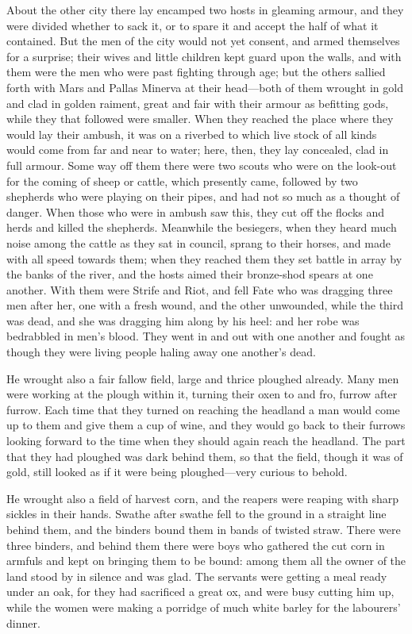About the other city there lay encamped two hosts in gleaming armour, and
they were divided whether to sack it, or to spare it and accept the half
of what it contained. But the men of the city would not yet consent, and
armed themselves for a surprise; their wives and little children kept
guard upon the walls, and with them were the men who were past fighting
through age; but the others sallied forth with Mars and Pallas Minerva at
their head—both of them wrought in gold and clad in golden raiment,
great and fair with their armour as befitting gods, while they that
followed were smaller. When they reached the place where they would lay
their ambush, it was on a riverbed to which live stock of all kinds would
come from far and near to water; here, then, they lay concealed, clad in
full armour. Some way off them there were two scouts who were on the
look-out for the coming of sheep or cattle, which presently came, followed
by two shepherds who were playing on their pipes, and had not so much as a
thought of danger. When those who were in ambush saw this, they cut off
the flocks and herds and killed the shepherds. Meanwhile the besiegers,
when they heard much noise among the cattle as they sat in council, sprang
to their horses, and made with all speed towards them; when they reached
them they set battle in array by the banks of the river, and the hosts
aimed their bronze-shod spears at one another. With them were Strife and
Riot, and fell Fate who was dragging three men after her, one with a fresh
wound, and the other unwounded, while the third was dead, and she was
dragging him along by his heel: and her robe was bedrabbled in men’s
blood. They went in and out with one another and fought as though they
were living people haling away one another’s dead.

He wrought also a fair fallow field, large and thrice ploughed already.
Many men were working at the plough within it, turning their oxen to and
fro, furrow after furrow. Each time that they turned on reaching the
headland a man would come up to them and give them a cup of wine, and they
would go back to their furrows looking forward to the time when they
should again reach the headland. The part that they had ploughed was dark
behind them, so that the field, though it was of gold, still looked as if
it were being ploughed—very curious to behold.

He wrought also a field of harvest corn, and the reapers were reaping with
sharp sickles in their hands. Swathe after swathe fell to the ground in a
straight line behind them, and the binders bound them in bands of twisted
straw. There were three binders, and behind them there were boys who
gathered the cut corn in armfuls and kept on bringing them to be bound:
among them all the owner of the land stood by in silence and was glad. The
servants were getting a meal ready under an oak, for they had sacrificed a
great ox, and were busy cutting him up, while the women were making a
porridge of much white barley for the labourers’ dinner.

